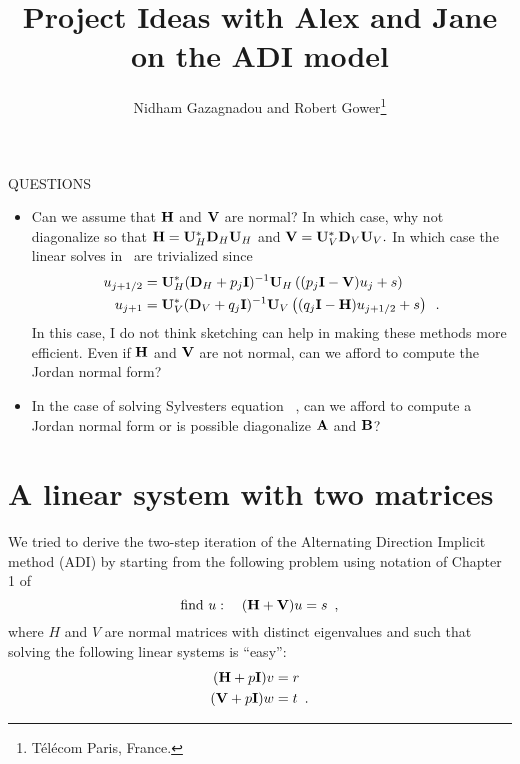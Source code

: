 \documentclass[10pt]{article}
\title{\bf Project Ideas with Alex and Jane on the ADI model}
\author{Nidham Gazagnadou and Robert Gower\footnote{T\'{e}l\'{e}com Paris, France.}}
\makeatletter
\renewcommand*{\eqref}[1]{%
  \hyperref[{#1}]{\textup{\tagform@{\ref*{#1}}}}%
}
\theoremstyle{definition}
\makeatother
\begin{document}
\maketitle


QUESTIONS
\begin{itemize}
\item Can we assume that ${\bf H}$ and ${\bf V}$ are normal? In which case, why not diagonalize so that ${\bf H} = {\bf U}^*_H {\bf D}_H {\bf U}_H$ and ${\bf V} = {\bf U}^*_V {\bf D}_V {\bf U}_V.$ In which case the linear solves in~\eqref{eq:adi_iteration} are trivialized since
\begin{align*}
 u_{j+1/2} &= {\bf U}_H^*({\bf D}_H+ p_j {\bf I})^{-1}{\bf U}_H \left((p_j {\bf I} - {\bf V}) u_{j} + s\right) \\
u_{j+1} &= {\bf U}_V^*({\bf D}_V+ q_j {\bf I})^{-1}{\bf U}_V \left( (q_j {\bf I} - {\bf H}) u_{j+1/2} + s\right) \enspace.
\end{align*}
In this case, I do not think sketching can help in making these methods more efficient. Even if ${\bf H}$ and ${\bf V}$ are not normal, can we afford to compute the Jordan normal form?
\item In the case of solving Sylvesters equation~\eqref{eq:sylvester}, can we afford to compute a Jordan normal form or is possible diagonalize ${\bf A}$ and ${\bf B}$?
\end{itemize}

\section{A linear system with two matrices}

We tried to derive the two-step iteration of the Alternating Direction Implicit method (ADI) by starting from the following problem using notation of Chapter 1 of~\cite{wachspress2013adi}
\begin{equation}
    \label{eq:adi_system}
   \mbox{find } u : \quad ({\bf H} + {\bf V}) u = s \enspace,
\end{equation}
where $H$ and $V$ are normal matrices with distinct eigenvalues and such that solving the following  linear systems is ``easy'':
\begin{align*}
    ({\bf H} + p{\bf I}) v &= r\\
    ({\bf V} + p{\bf I}) w &= t \enspace.
\end{align*}
\end{document}
